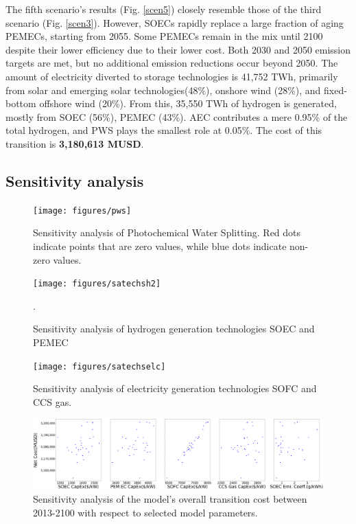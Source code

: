 The fifth scenario's results (Fig. \ref{scen5}) closely resemble those of the third scenario (Fig. \ref{scen3}). However, \gls{SOEC}s rapidly replace a large fraction of aging \gls{PEMEC}s, starting from 2055. Some \gls{PEMEC}s remain in the mix until 2100 despite their lower efficiency due to their lower cost. Both 2030 and 2050 emission targets are met, but no additional emission reductions occur beyond 2050. The amount of electricity diverted to storage technologies is 41,752 TWh, primarily from solar and emerging solar technologies(48\%), onshore wind (28\%), and fixed-bottom offshore wind (20\%). From this, 35,550 TWh of hydrogen is generated, mostly from \gls{SOEC} (56\%), \gls{PEMEC} (43\%). \gls{AEC} contributes a mere 0.95\% of the total hydrogen, and \gls{PWS} plays the smallest role at 0.05\%. The cost of this transition is \textbf{3,180,613 MUSD}.

\subsection{Sensitivity analysis}

\begin{figure}[H] 
\centering
\hspace*{-1cm}
\texttt{[image: figures/pws]}
\caption{Sensitivity analysis of Photochemical Water Splitting. Red dots indicate points that are zero values, while blue dots indicate non-zero values.}
\label{pws}
\end{figure}

\begin{figure}[H] 
\centering
\texttt{[image: figures/satechsh2]}
\caption{Sensitivity analysis of hydrogen generation technologies \gls{SOEC} and \gls{PEMEC}}.
\label{satechs-h2}
\end{figure}

\begin{figure}[H] 
\centering
\texttt{[image: figures/satechselc]}
\caption{Sensitivity analysis of electricity generation technologies \gls{SOFC} and \gls{CCS} gas.}
\label{satechs-elc}
\end{figure}


\begin{figure}[H] 
\centering
\includegraphics[scale=0.15]{figures/syscost}
\caption{Sensitivity analysis of the model's overall transition cost between 2013-2100 with respect to selected model parameters.}
\label{syscost}
\end{figure}

